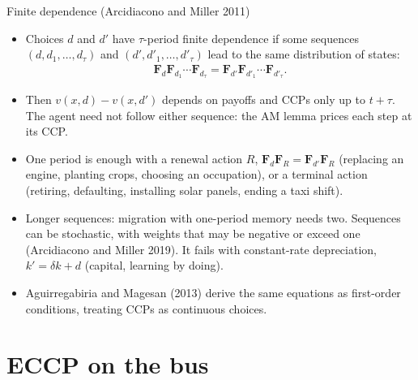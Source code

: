 \documentclass[aspectratio=169,11pt]{beamer}
\begin{document}
\begin{frame}{Finite dependence (Arcidiacono and Miller 2011)}
\small
\begin{itemize}
\item Choices $d$ and $d'$ have \alert{$\tau$-period finite dependence} if some sequences $(d, d_1, \ldots, d_\tau)$ and $(d', d'_1, \ldots, d'_\tau)$ lead to the same distribution of states:
\begin{align*}
\symbf F_d \symbf F_{d_1} \cdots \symbf F_{d_\tau} = \symbf F_{d'} \symbf F_{d'_1} \cdots \symbf F_{d'_\tau}.
\end{align*}
\item Then $v(x,d) - v(x,d')$ depends on payoffs and CCPs only up to $t + \tau$. The agent need not follow either sequence: the AM lemma prices each step at its CCP.
\item One period is enough with a \alert{renewal} action $R$, $\symbf F_d \symbf F_R = \symbf F_{d'} \symbf F_R$ (replacing an engine, planting crops, choosing an occupation), or a \alert{terminal} action (retiring, defaulting, installing solar panels, ending a taxi shift).
\item Longer sequences: migration with one-period memory needs two. Sequences can be stochastic, with weights that may be negative or exceed one (Arcidiacono and Miller 2019). It fails with constant-rate depreciation, $k' = \delta k + d$ (capital, learning by doing).
\item Aguirregabiria and Magesan (2013) derive the same equations as first-order conditions, treating CCPs as continuous choices.
\end{itemize}
\end{frame}

\section{ECCP on the bus}
\end{document}
